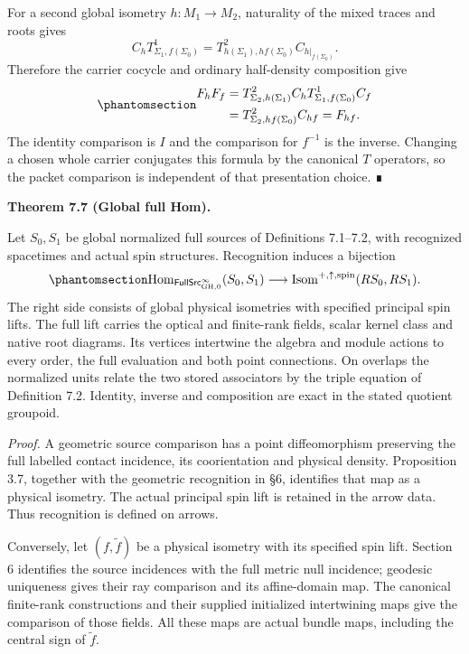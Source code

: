 \documentclass[
  english,
  11pt,
  reqno]{amsart}
\makeatletter
\newcommand{\pandocstatementheading}[1]{%
  \par\addpenalty{\@beginparpenalty}%
  \addvspace{.5\baselineskip plus .2\baselineskip minus .2\baselineskip}%
  {\normalfont\bfseries #1\par}%
  \nobreak\@afterindenttrue\@afterheading
}
\makeatother
\begin{document}
For a second global isometry \(h:M_1\to M_2\), naturality of the mixed
traces and roots gives \[
C_h T^1_{\Sigma_1,f(\Sigma_0)}
 =T^2_{h(\Sigma_1),hf(\Sigma_0)}C_{h|_{f(\Sigma_0)}}.
\] Therefore the carrier cocycle and ordinary half-density composition
give
\begin{equation}\protect\phantomsection\label{eq:global-native-isometry-composition}{
\begin{aligned}
F_hF_f
 &=T^2_{\Sigma_2,h(\Sigma_1)}C_h
   T^1_{\Sigma_1,f(\Sigma_0)}C_f\\
 &=T^2_{\Sigma_2,hf(\Sigma_0)}C_{hf}
 =F_{hf}.
\end{aligned}
}\end{equation} The identity comparison is \(I\) and the comparison for
\(f^{-1}\) is the inverse. Changing a chosen whole carrier conjugates
this formula by the canonical \(T\) operators, so the packet comparison
is independent of that presentation choice. ∎

\pandocstatementheading{\protect{}\label{thm:global-full-source-hom}Theorem 7.7 (Global full Hom).}

Let \(S_0,S_1\) be global normalized full sources of Definitions
7.1--7.2, with recognized spacetimes and actual spin structures.
Recognition induces a bijection
\begin{equation}\protect\phantomsection\label{eq:global-full-source-hom-bijection}{
\operatorname{Hom}_{\mathsf{FullSrc}^{\infty}_{\mathrm{GH},0}}(S_0,S_1)
\longrightarrow
\operatorname{Isom}^{+,\uparrow,\mathrm{spin}}(R S_0,R S_1).
}\end{equation} The right side consists of global physical isometries
with specified principal spin lifts. The full lift carries the optical
and finite-rank fields, scalar kernel class and native root diagrams.
Its vertices intertwine the algebra and module actions to every order,
the full evaluation and both point connections. On overlaps the
normalized units relate the two stored associators by the triple
equation of Definition 7.2. Identity, inverse and composition are exact
in the stated quotient groupoid.

\emph{Proof.} A geometric source comparison has a point diffeomorphism
preserving the full labelled contact incidence, its coorientation and
physical density. Proposition 3.7, together with the geometric
recognition in §6, identifies that map as a physical isometry. The
actual principal spin lift is retained in the arrow data. Thus
recognition is defined on arrows.

Conversely, let \((f,\widetilde f)\) be a physical isometry with its
specified spin lift. Section 6 identifies the source incidences with the
full metric null incidence; geodesic uniqueness gives their ray
comparison and its affine-domain map. The canonical finite-rank
constructions and their supplied initialized intertwining maps give the
comparison of those fields. All these maps are actual bundle maps,
including the central sign of \(\widetilde f\).
\end{document}
